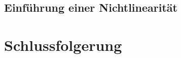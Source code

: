 \documentclass[
	a4paper,
	12pt,
	pagesize,
	ngerman
]{scrartcl}
\begin{document}
	\subsection{Einführung einer Nichtlinearität}
	
	\section{Schlussfolgerung}
	
\end{document}
